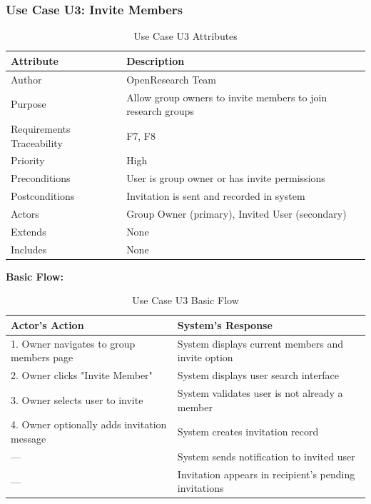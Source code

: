 \documentclass[11pt,a4paper]{article}
\begin{document}
\subsubsection{Use Case U3: Invite Members}

\begin{table}[H]
\centering
\begin{tabular}{p{4cm}p{9cm}}
\toprule
\textbf{Attribute} & \textbf{Description} \\
\midrule
Author & OpenResearch Team \\
Purpose & Allow group owners to invite members to join research groups \\
Requirements Traceability & F7, F8 \\
Priority & High \\
Preconditions & User is group owner or has invite permissions \\
Postconditions & Invitation is sent and recorded in system \\
Actors & Group Owner (primary), Invited User (secondary) \\
Extends & None \\
Includes & None \\
\bottomrule
\end{tabular}
\caption{Use Case U3 Attributes}
\end{table}

\textbf{Basic Flow:}

\begin{table}[H]
\centering
\begin{tabular}{p{6cm}p{7cm}}
\toprule
\textbf{Actor's Action} & \textbf{System's Response} \\
\midrule
1. Owner navigates to group members page & System displays current members and invite option \\
2. Owner clicks "Invite Member" & System displays user search interface \\
3. Owner selects user to invite & System validates user is not already a member \\
4. Owner optionally adds invitation message & System creates invitation record \\
--- & System sends notification to invited user \\
--- & Invitation appears in recipient's pending invitations \\
\bottomrule
\end{tabular}
\caption{Use Case U3 Basic Flow}
\end{table}
\end{document}
